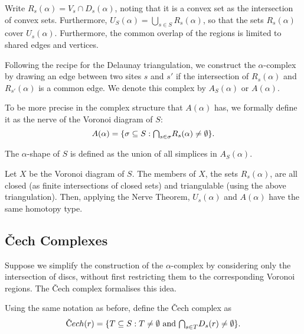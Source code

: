 Write $R_s(\alpha) = V_s \cap D_s(\alpha)$, noting that it is a convex set as the intersection of convex sets. Furthermore, $U_S(\alpha) = \bigcup_{s \in S} R_s(\alpha)$, so that the sets $R_s(\alpha)$ cover $U_s(\alpha)$. Furthermore, the common overlap of the regions is limited to shared edges and vertices.


Following the recipe for the Delaunay triangulation, we construct the $\alpha$-complex by drawing an edge between two sites $s$ and $s'$ if the intersection of $R_s(\alpha)$ and $R_{s'}(\alpha)$ is a common edge. We denote this complex by $A_S(\alpha)$ or $A(\alpha)$.


\begin{definition}
To be more precise in the complex structure that $A(\alpha)$ has, we formally define it as the nerve of the Voronoi diagram of $S$:
$$
A(\alpha) = \{\sigma \subseteq S : \mathsmaller{\bigcap}_{s \in \sigma}R_s(\alpha) \not= \emptyset\}.
$$
\end{definition}


\begin{definition}
The $\alpha$-shape of $S$ is defined as the union of all simplices in $A_{S}(\alpha)$.
\end{definition}


Let $X$ be the Voronoi diagram of $S$. The members of $X$, the sets $R_s(\alpha)$, are all closed (as finite intersections of closed sets) and triangulable (using the above triangulation). Then, applying the Nerve Theorem, $U_s(\alpha)$ and $A(\alpha)$ have the same homotopy type.




\subsection{\v{C}ech Complexes}


Suppose we simplify the construction of the $\alpha$-complex by considering only the intersection of discs, without first restricting them to the corresponding Voronoi regions. The \v{C}ech complex formalises this idea.


\begin{definition}
Using the same notation as before, define the \v{C}ech complex as
$$
\text{\v{C}}ech(r) = \{T \subseteq S : T \not= \emptyset \text{ and } \mathsmaller{\bigcap}_{s \in T} D_s(r) \not = \emptyset\}.
$$
\end{definition}


